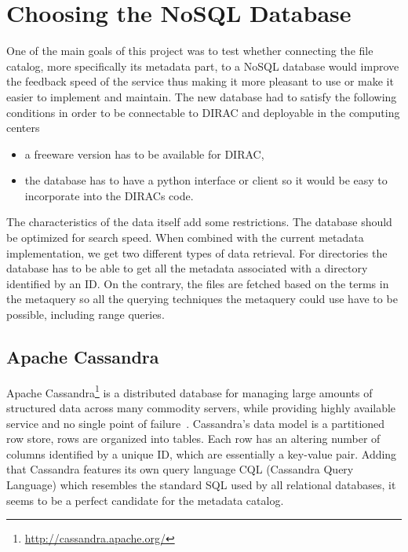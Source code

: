 \chapter{Choosing the NoSQL Database}
\label{chap:databases}
One of the main goals of this project was to test whether connecting the 
file catalog, more specifically its metadata part, to a NoSQL database would 
improve the feedback speed of the service thus making it more pleasant to use
or make it easier to implement and maintain. The new database had to satisfy the
following conditions in order to be connectable to DIRAC and deployable in
the computing centers

\begin{itemize}
\item a freeware version has to be available for DIRAC,
\item the database has to have a python interface or client so it would be easy
to incorporate into the DIRACs code.
\end{itemize}

The characteristics of the data itself add some restrictions. The database should be
optimized for search speed. When combined with the current metadata implementation, we
get two different types of data retrieval. For directories 
the database has to be able to get all the metadata associated with a directory
identified by an ID. On the contrary, the files are fetched based on the terms in the metaquery so
all the querying techniques the metaquery could use have to be possible, including
range queries. 



\section{Apache Cassandra}
Apache Cassandra\footnote{\url{http://cassandra.apache.org/}} is a distributed database for managing large amounts 
of structured data across many commodity servers, while providing highly available service and no single point 
of failure~\cite{cassandra}. Cassandra's data model is a
partitioned row store, rows are organized into tables. Each row
has an altering number of columns identified by a unique ID, which are essentially a
key-value pair. Adding that Cassandra features
its own query language CQL (Cassandra Query Language) which resembles the standard SQL 
used by all relational databases, it seems to be a perfect candidate for the metadata catalog.

